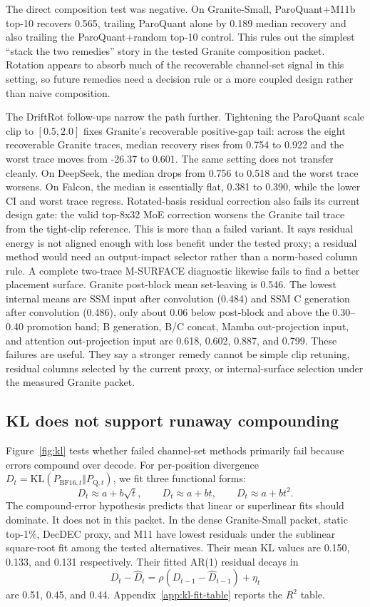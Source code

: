 \documentclass{article}
\begin{document}
The direct composition test was negative. On Granite-Small, ParoQuant+M11b top-10 recovers 0.565, trailing ParoQuant alone by 0.189 median recovery and also trailing the ParoQuant+random top-10 control. This rules out the simplest ``stack the two remedies'' story in the tested Granite composition packet. Rotation appears to absorb much of the recoverable channel-set signal in this setting, so future remedies need a decision rule or a more coupled design rather than naive composition.

The DriftRot follow-ups narrow the path further. Tightening the ParoQuant scale clip to $[0.5,2.0]$ fixes Granite's recoverable positive-gap tail: across the eight recoverable Granite traces, median recovery rises from 0.754 to 0.922 and the worst trace moves from -26.37 to 0.601. The same setting does not transfer cleanly. On DeepSeek, the median drops from 0.756 to 0.518 and the worst trace worsens. On Falcon, the median is essentially flat, 0.381 to 0.390, while the lower CI and worst trace regress. Rotated-basis residual correction also fails its current design gate: the valid top-8x32 MoE correction worsens the Granite tail trace from the tight-clip reference. This is more than a failed variant. It says residual energy is not aligned enough with loss benefit under the tested proxy; a residual method would need an output-impact selector rather than a norm-based column rule. A complete two-trace M-SURFACE diagnostic likewise fails to find a better placement surface. Granite post-block mean set-leaving is 0.546. The lowest internal means are SSM input after convolution (0.484) and SSM C generation after convolution (0.486), only about 0.06 below post-block and above the 0.30--0.40 promotion band; B generation, B/C concat, Mamba out-projection input, and attention out-projection input are 0.618, 0.602, 0.887, and 0.799. These failures are useful. They say a stronger remedy cannot be simple clip retuning, residual columns selected by the current proxy, or internal-surface selection under the measured Granite packet.



\subsection{KL does not support runaway compounding}

Figure~\ref{fig:kl} tests whether failed channel-set methods primarily fail because errors compound over decode. For per-position divergence $D_t=\mathrm{KL}(P_{\mathrm{BF16},t}\Vert P_{\mathrm{Q},t})$, we fit three functional forms:
\[
  D_t \approx a+b\sqrt{t}, \qquad D_t \approx a+bt, \qquad D_t \approx a+bt^2.
\]
The compound-error hypothesis predicts that linear or superlinear fits should dominate. It does not in this packet. In the dense Granite-Small packet, static top-1\%, DecDEC proxy, and M11 have lowest residuals under the sublinear square-root fit among the tested alternatives. Their mean KL values are 0.150, 0.133, and 0.131 respectively. Their fitted AR(1) residual decays in
\[
  D_t-\widehat{D}_t=\rho(D_{t-1}-\widehat{D}_{t-1})+\eta_t
\]
are 0.51, 0.45, and 0.44. Appendix~\ref{app:kl-fit-table} reports the $R^2$ table.
\end{document}
